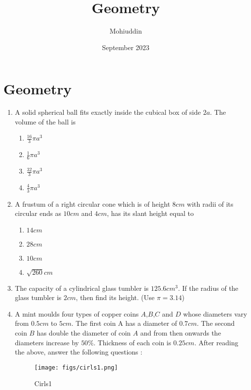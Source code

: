 \documentclass{article}
\title{Geometry}
\author{Mohiuddin}
\date{September 2023}
\begin{document}
\maketitle

\section{Geometry}
\begin{enumerate}
    \item A solid spherical ball fits exactly inside the cubical box of side $2a$. The volume of the ball is 
\begin{enumerate}
    \item $\frac{16}{3}\pi a^3$
    \item $\frac{1}{6}\pi a^3$
    \item $\frac{32}{3}\pi a^3$
        \item $\frac{4}{3}\pi a^3$
    \end{enumerate}
    
    \item A frustum of a right circular cone which is of height $8 cm$ with radii of its circular ends as $10 cm$ and $4 cm$, has its slant height equal to 
\begin{enumerate}
    \item $ 14 cm$
    \item $28 cm$
    \item $10 cm$
    \item $\sqrt{260}cm$
    \end{enumerate}
    
    \item The capacity of a cylindrical glass tumbler is $125.6 cm^3$. If the radius of the glass tumbler is $2 cm$, then find its height. (Use $\pi= 3.14$)
\newpage
\item A mint moulds four types of copper coins $A$,$B$,$C$ and $D$ whose diameters vary from $0.5 cm$ to $5 cm$. The first coin A has a diameter of $0.7 cm$. The second coin $B$ has double the diameter of coin $A$ and from then onwards the diameters increase by $50\%$. Thickness of each coin is $0.25 cm$.
    After reading the above, answer the following questions :
\begin{figure}[H]
    \centering
    \texttt{[image: figs/cirls1.png]}
    \caption{Cirls1}
    \label{fig:cirls1}
    \end{figure}
      

\end{enumerate}
\end{document}
